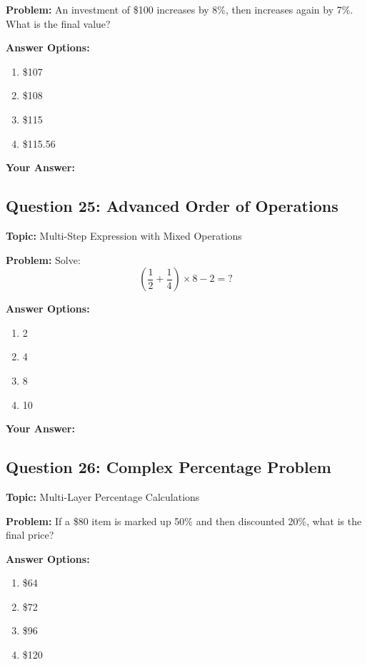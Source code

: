 \documentclass[12pt]{article}
\begin{document}
\textbf{Problem:} An investment of \$100 increases by 8\%, then increases again by 7\%. What is the final value?

\textbf{Answer Options:}
\begin{enumerate}[label=\Alph*)]
    \item \$107
    \item \$108
    \item \$115
    \item \$115.56
\end{enumerate}

\noindent\textbf{Your Answer:} \underline{\hspace{2cm}}

\vspace{0.5cm}


\subsection{Question 25: Advanced Order of Operations}
\textbf{Topic:} Multi-Step Expression with Mixed Operations

\textbf{Problem:} Solve:
\[\left(\frac{1}{2} + \frac{1}{4}\right) \times 8 - 2 = ?\]

\textbf{Answer Options:}
\begin{enumerate}[label=\Alph*)]
    \item 2
    \item 4
    \item 8
    \item 10
\end{enumerate}

\noindent\textbf{Your Answer:} \underline{\hspace{2cm}}

\vspace{0.5cm}


\subsection{Question 26: Complex Percentage Problem}
\textbf{Topic:} Multi-Layer Percentage Calculations

\textbf{Problem:} If a \$80 item is marked up 50\% and then discounted 20\%, what is the final price?

\textbf{Answer Options:}
\begin{enumerate}[label=\Alph*)]
    \item \$64
    \item \$72
    \item \$96
    \item \$120
\end{enumerate}
\end{document}
